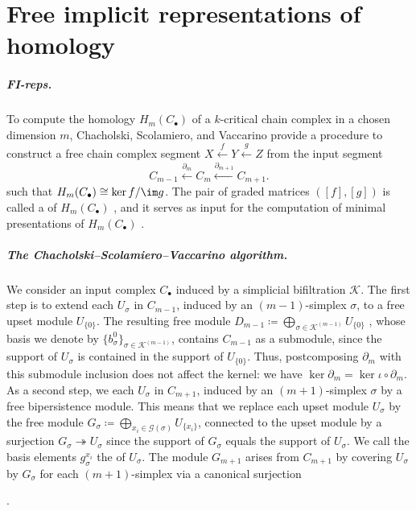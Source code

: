 \section{Free implicit representations of homology}
\label{sec:FI-reps}
%
\subparagraph{FI-reps.} To compute the homology $H_m(C_\bullet)$ of a $k$-critical chain complex in a chosen dimension $m$, Chacholski, Scolamiero, and Vaccarino \cite{swedish} provide a procedure
to construct a free chain complex segment $X \xleftarrow{f} Y \xleftarrow{g} Z $ from the input segment
\begin{equation}
\label{diag:chain_complex_segment}
C_{m-1}\xleftarrow{\partial_m} C_m \xleftarrow{\partial_{m+1}}C_{m+1}.
\end{equation}
such that $H_m(C_\bullet)\cong \ker f / \im g$. The pair of graded matrices $([f],[g])$ is called a  of $H_m(C_\bullet)$ \cite{lw-computing}, and it serves as input for the computation of minimal presentations of $H_m(C_\bullet)$ \cite{lw-computing,kr-fast}. 
%
%
%
%
\subparagraph{The Chacholski--Scolamiero--Vaccarino algorithm.} We consider an input complex $C_\bullet$ induced by a simplicial bifiltration $\mathcal{K}$.
The first step is to extend each $U_\sigma$ in $C_{m-1}$, induced by an $(m-1)$-simplex $\sigma$, to a free upset module $U_{\{0\}}$.
The resulting free module $D_{m-1}\coloneqq 
\bigoplus_{\sigma\in \mathcal{K}^{(m-1)}} U_{\{0\}}$ , whose basis we denote by $\{b_\sigma^0\}_{\sigma\in \mathcal{K}^{(m-1)}}$, contains $C_{m-1}$ as a submodule, since the support of $U_\sigma$ is contained in the support of $U_{\{0\}}$.
Thus, postcomposing $\partial_m$ with this submodule inclusion does not affect the kernel: we have $\ker\partial_{m} = \ker\iota\circ\partial_{m}$.
%
As a second step, we  each $U_\sigma$ in $C_{m+1}$, induced by an $(m+1)$-simplex $\sigma$ by a free bipersistence module.
This means that we replace each upset module $U_\sigma$ by the free module 
$
G_\sigma\coloneqq 
\bigoplus_{x_i \in \mathcal{G}(\sigma)} U_{\{x_i\}}
$,
connected to the upset module by a surjection $G_\sigma \twoheadrightarrow U_\sigma$ since the support of $G_\sigma$ equals the support of $U_\sigma$.
We call the basis elements $g^{x_i}_\sigma$ the  of $
U_\sigma$.
The module $G_{m+1}$ arises from $C_{m+1}$ by covering $U_\sigma$ by $G_\sigma$ for each $(m+1)$-simplex via a canonical surjection .

